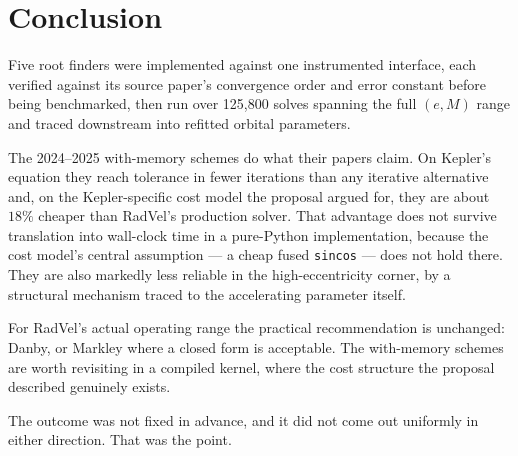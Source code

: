 \documentclass[11pt,a4paper]{article}
\newcommand{\dividerline}{\vspace{0.2em}{\color{Rule}\hrule height 0.5pt}\vspace{0.6em}}
\begin{document}
\section{Conclusion}

Five root finders were implemented against one instrumented interface,
each verified against its source paper's convergence order and error
constant before being benchmarked, then run over 125{,}800 solves spanning
the full $(e,M)$ range and traced downstream into refitted orbital
parameters.

The 2024--2025 with-memory schemes do what their papers claim. On Kepler's
equation they reach tolerance in fewer iterations than any iterative
alternative and, on the Kepler-specific cost model the proposal argued
for, they are about $18\%$ cheaper than RadVel's production solver. That
advantage does not survive translation into wall-clock time in a
pure-Python implementation, because the cost model's central assumption
--- a cheap fused \texttt{sincos} --- does not hold there. They are also
markedly less reliable in the high-eccentricity corner, by a structural
mechanism traced to the accelerating parameter itself.

For RadVel's actual operating range the practical recommendation is
unchanged: Danby, or Markley where a closed form is acceptable. The
with-memory schemes are worth revisiting in a compiled kernel, where the
cost structure the proposal described genuinely exists.

The outcome was not fixed in advance, and it did not come out uniformly in
either direction. That was the point.

\vspace{1.4em}
\dividerline

\end{document}
